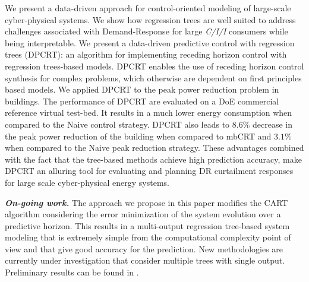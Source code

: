 \textcolor[rgb]{1.00,0.00,0.00}{We present a data-driven approach for control-oriented modeling of large-scale cyber-physical systems. We show how regression trees are well suited to address challenges associated with Demand-Response for large \textit{C/I/I} consumers while being interpretable. We present a data-driven predictive control with regression trees (DPCRT): an algorithm for implementing receding horizon control with regression trees-based models. DPCRT enables the use of receding horizon control synthesis for complex problems, which otherwise are dependent on first principles based models. We applied DPCRT to the peak power reduction problem in buildings. The performance of DPCRT are evaluated on a DoE commercial reference virtual test-bed. It results in a much lower energy consumption when compared to the Naive control strategy. DPCRT also leads to $8.6\%$ decrease in the peak power reduction of the building when compared to mbCRT and $3.1\%$ when compared to the Naive peak reduction strategy. These advantages combined with the fact that the tree-based methods achieve high prediction accuracy, make DPCRT an alluring tool for evaluating and planning DR curtailment responses for large scale cyber-physical energy systems.}

\textcolor[rgb]{0.00,0.00,1.00}{\textbf{\emph{On-going work.}} The approach we propose in this paper modifies the CART algorithm considering the error minimization of the system evolution over a predictive horizon. This results in a multi-output regression tree-based system modeling that is extremely simple from the computational complexity point of view and that give good accuracy for the prediction. New methodologies are currently under investigation that consider multiple trees with single output. Preliminary results can be found in \cite{JainACC2017,JainCDC2017}.}

